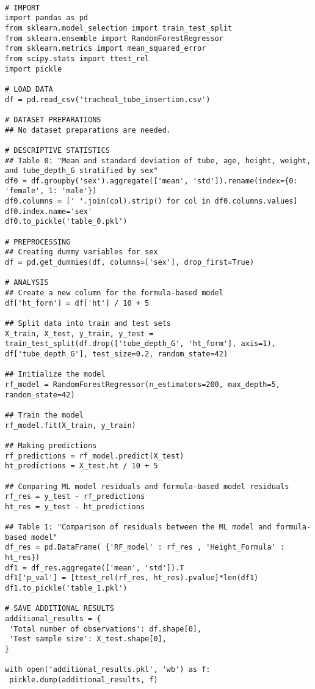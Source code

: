 \documentclass[11pt]{article}
\begin{document}
\begin{verbatim}

# IMPORT
import pandas as pd
from sklearn.model_selection import train_test_split
from sklearn.ensemble import RandomForestRegressor
from sklearn.metrics import mean_squared_error
from scipy.stats import ttest_rel
import pickle

# LOAD DATA
df = pd.read_csv('tracheal_tube_insertion.csv')

# DATASET PREPARATIONS
## No dataset preparations are needed.

# DESCRIPTIVE STATISTICS
## Table 0: "Mean and standard deviation of tube, age, height, weight, and tube_depth_G stratified by sex"
df0 = df.groupby('sex').aggregate(['mean', 'std']).rename(index={0: 'female', 1: 'male'})
df0.columns = [' '.join(col).strip() for col in df0.columns.values]
df0.index.name='sex'
df0.to_pickle('table_0.pkl')

# PREPROCESSING
## Creating dummy variables for sex
df = pd.get_dummies(df, columns=['sex'], drop_first=True)

# ANALYSIS
## Create a new column for the formula-based model
df['ht_form'] = df['ht'] / 10 + 5

## Split data into train and test sets
X_train, X_test, y_train, y_test = train_test_split(df.drop(['tube_depth_G', 'ht_form'], axis=1), df['tube_depth_G'], test_size=0.2, random_state=42)

## Initialize the model
rf_model = RandomForestRegressor(n_estimators=200, max_depth=5, random_state=42)

## Train the model
rf_model.fit(X_train, y_train)

## Making predictions
rf_predictions = rf_model.predict(X_test)
ht_predictions = X_test.ht / 10 + 5

## Comparing ML model residuals and formula-based model residuals
rf_res = y_test - rf_predictions
ht_res = y_test - ht_predictions

## Table 1: "Comparison of residuals between the ML model and formula-based model"
df_res = pd.DataFrame( {'RF_model' : rf_res , 'Height_Formula' : ht_res})
df1 = df_res.aggregate(['mean', 'std']).T
df1['p_val'] = [ttest_rel(rf_res, ht_res).pvalue]*len(df1)
df1.to_pickle('table_1.pkl')

# SAVE ADDITIONAL RESULTS
additional_results = {
 'Total number of observations': df.shape[0],
 'Test sample size': X_test.shape[0],
}

with open('additional_results.pkl', 'wb') as f:
 pickle.dump(additional_results, f)

\end{verbatim}
\end{document}
